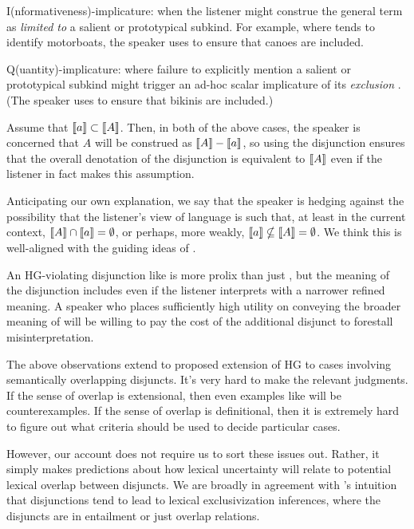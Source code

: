 \documentclass{article}
\begin{document}
\begin{examples}
  \begin{examples}
  \item I(nformativeness)-implicature: when the listener might
    construe the general term as \emph{limited to} a salient or
    prototypical subkind. For example, where  tends to
    identify motorboats, the speaker uses  to
    ensure that canoes are included.
    
  \item Q(uantity)-implicature: where failure to explicitly mention a
    salient or prototypical subkind might trigger an ad-hoc scalar
    implicature of its \emph{exclusion} \citep{hirschberg:1985}. (The
    speaker uses  to ensure that bikinis are
    included.)
  \end{examples}

\item Assume that $\llbracket a\rrbracket \subset \llbracket A\rrbracket$. Then, in both of the
  above cases, the speaker is concerned that $A$ will be construed as
  $\llbracket A\rrbracket-\llbracket a\rrbracket$, so using the disjunction ensures that the overall
  denotation of the disjunction is equivalent to $\llbracket A\rrbracket$ even if the
  listener in fact makes this assumption.

\item Anticipating our own explanation, we say that the speaker is
  hedging against the possibility that the listener's view of language
  is such that, at least in the current context, $\llbracket A\rrbracket \cap \llbracket a\rrbracket
  = \emptyset$, or perhaps, more weakly, $ \llbracket a\rrbracket \nsubseteq \llbracket A\rrbracket
  = \emptyset$. We think this is well-aligned with the guiding ideas
  of \citet{Chemla-HurfordCounts}.

\item An HG-violating disjunction like  is more
  prolix than just , but the meaning of the disjunction
  includes  even if the listener interprets 
  with a narrower refined meaning.  A speaker who places sufficiently
  high utility on conveying the broader meaning of  will be
  willing to pay the cost of the additional disjunct to forestall
  misinterpretation.

\item The above observations extend to  proposed
  extension of HG to cases involving semantically overlapping
  disjuncts. It's very hard to make the relevant judgments.  If the
  sense of overlap is extensional, then even examples like
   will be counterexamples. If the sense of
  overlap is definitional, then it is extremely hard to figure out
  what criteria should be used to decide particular cases. 

\item However, our account does not require us to sort these issues
  out. Rather, it simply makes predictions about how lexical
  uncertainty will relate to potential lexical overlap between
  disjuncts. We are broadly in agreement with
  \citeauthor{Singh:2008}'s intuition that disjunctions tend to lead
  to lexical exclusivization inferences, where the disjuncts are in
  entailment or just overlap relations.
\end{examples}
 
\end{document}
